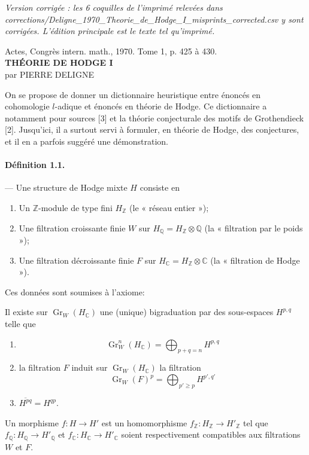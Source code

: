 \documentclass[10pt]{article}
\newcommand{\C}{\mathbb C}
\newcommand{\Q}{\mathbb Q}
\newcommand{\Z}{\mathbb Z}
\newcommand{\Gr}{\operatorname{Gr}}
\begin{document}
\begin{center}\small\itshape Version corrigée : les 6 coquilles de l'imprimé relevées dans corrections/Deligne\_1970\_Theorie\_de\_Hodge\_I\_misprints\_corrected.csv y sont corrigées. L'édition principale est le texte tel qu'imprimé.\end{center}


\begin{center}
{\small Actes, Congrès intern. math., 1970. Tome 1, p. 425 à 430.}\\[4em]
{\Large\bfseries THÉORIE DE HODGE I}\\[1.6em]
{\large par PIERRE DELIGNE}
\end{center}

On se propose de donner un dictionnaire heuristique entre énoncés en cohomologie $l$-adique et énoncés en théorie de Hodge. Ce dictionnaire a notamment pour sources [3] et la théorie conjecturale des motifs de Grothendieck [2]. Jusqu'ici, il a surtout servi à formuler, en théorie de Hodge, des conjectures, et il en a parfois suggéré une démonstration.

\paragraph{Définition 1.1.} — Une structure de Hodge mixte $H$ consiste en
\begin{enumerate}[label=(\alph*)]
\item Un $\Z$-module de type fini $H_\Z$ (le « réseau entier »);
\item Une filtration croissante finie $W$ sur $H_\Q=H_\Z\otimes\Q$ (la « filtration par le poids »); %
\item Une filtration décroissante finie $F$ sur $H_\C=H_\Z\otimes\C$ (la « filtration de Hodge »).
\end{enumerate}
Ces données sont soumises à l'axiome:

Il existe sur $\Gr_W(H_\C)$ une (unique) bigraduation par des sous-espaces $H^{p,q}$ telle que
\begin{enumerate}[label=(\roman*)]
\item
\[
\Gr_W^n(H_\C)=\bigoplus_{p+q=n}H^{p,q}
\]
\item la filtration $F$ induit sur $\Gr_W(H_\C)$ la filtration
\[
\Gr_W(F)^p=\bigoplus_{p'\ge p}H^{p',q'}
\]
\item $\overline{H^{pq}}=H^{qp}$.
\end{enumerate}
Un morphisme $f:H\to H'$ est un homomorphisme $f_\Z:H_\Z\to H'_\Z$ tel que $f_\Q:H_\Q\to H'_\Q$ et $f_\C:H_\C\to H'_\C$ soient respectivement compatibles aux filtrations $W$ et $F$.
\end{document}
